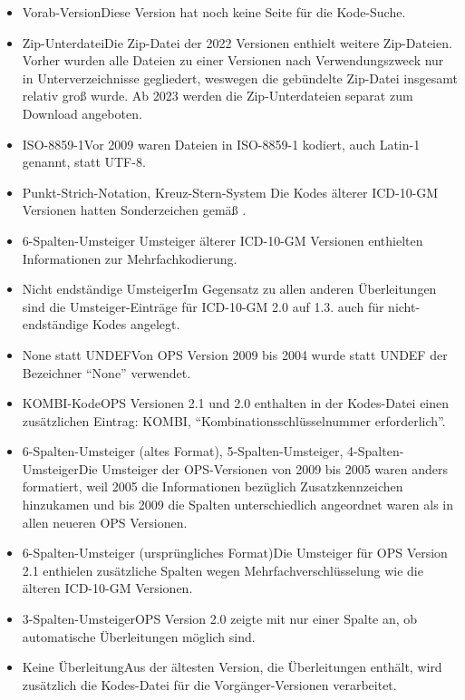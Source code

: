 \begin{itemize}
\item Vorab-Version\newline Diese Version hat noch keine Seite für die Kode-Suche.
\item Zip-Unterdatei\newline Die Zip-Datei der 2022 Versionen enthielt weitere Zip-Dateien. Vorher wurden alle Dateien zu einer Versionen nach Verwendungszweck nur in Unterverzeichnisse gegliedert, weswegen die gebündelte Zip-Datei insgesamt relativ groß wurde. Ab 2023 werden die Zip-Unterdateien separat zum Download angeboten.
\item ISO-8859-1\newline Vor 2009 waren Dateien in ISO-8859-1 kodiert, auch Latin-1 genannt, statt UTF-8.
\item Punkt-Strich-Notation, Kreuz-Stern-System \newline Die Kodes älterer ICD-10-GM Versionen hatten Sonderzeichen gemäß \citep{bfarmicdkk}.
\item 6-Spalten-Umsteiger \newline Umsteiger älterer ICD-10-GM Versionen enthielten Informationen zur Mehrfachkodierung. 
\item Nicht endständige Umsteiger\newline Im Gegensatz zu allen anderen Überleitungen sind die Umsteiger-Einträge für ICD-10-GM 2.0 auf 1.3. auch für nicht-endständige Kodes angelegt. 
\item None statt UNDEF\newline Von OPS Version 2009 bis 2004 wurde statt UNDEF der Bezeichner ``None'' verwendet. 
\item KOMBI-Kode\newline OPS Versionen 2.1 und 2.0 enthalten in der Kodes-Datei einen zusätzlichen Eintrag: KOMBI, ``Kombinationsschlüsselnummer erforderlich''. 
\item 6-Spalten-Umsteiger (altes Format), 5-Spalten-Umsteiger, 4-Spalten-Umsteiger\newline Die Umsteiger der OPS-Versionen von 2009 bis 2005 waren anders formatiert, weil 2005 die Informationen bezüglich Zusatzkennzeichen hinzukamen und bis 2009 die Spalten unterschiedlich angeordnet waren als in allen neueren OPS Versionen. 
\item 6-Spalten-Umsteiger (ursprüngliches Format)\newline Die Umsteiger für OPS Version 2.1 enthielen zusätzliche Spalten wegen Mehrfachverschlüsselung wie die älteren ICD-10-GM Versionen. 
\item 3-Spalten-Umsteiger\newline OPS Version 2.0 zeigte mit nur einer Spalte an, ob automatische Überleitungen möglich sind. 
\item Keine Überleitung\newline Aus der ältesten Version, die Überleitungen enthält, wird zusätzlich die Kodes-Datei für die Vorgänger-Versionen verarbeitet.
\end{itemize}

